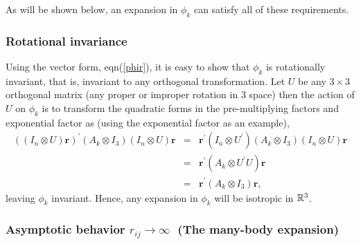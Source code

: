 \documentclass[12pt,thmsa]{article}
\begin{document}
\noindent As will be shown below, an expansion in $\phi _k$ can satisfy all
of these requirements.

\subsubsection{Rotational invariance}

Using the vector form, eqn(\ref{phir}), it is easy to show that $\phi _k$ is
rotationally invariant, that is, invariant to any orthogonal transformation.
Let $U$ be any $3\times 3$ orthogonal matrix (any proper or improper
rotation in 3 space) then the action of $U$ on $\phi _k$ is to transform the
quadratic forms in the pre-multiplying factors and exponential factor as
(using the exponential factor as an example), 
\begin{eqnarray}
\left( \left( I_n\otimes U\right) \mathbf{r}\right) ^{\prime }(A_k\otimes
I_3)\left( I_n\otimes U\right) \mathbf{r} &=&\mathbf{r}^{\prime }\left(
I_n\otimes U^{\prime }\right) (A_k\otimes I_3)\left( I_n\otimes U\right) 
\mathbf{r} \\
&=&\mathbf{r}^{\prime }(A_k\otimes U^{\prime }U)\mathbf{r} \\
&=&\mathbf{r}^{\prime }(A_k\otimes I_3)\mathbf{r,}
\end{eqnarray}
leaving $\phi _k$ invariant. Hence, any expansion in $\phi _k$ will be
isotropic in $\Bbb{R}^3$.

\subsubsection{Asymptotic behavior $r_{ij}\rightarrow \infty \,\,\,\,$(The
many-body expansion)}
\end{document}
